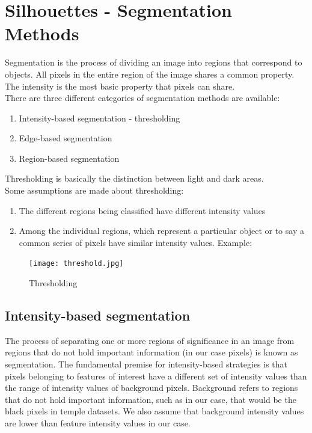 \documentclass[a4paper]{report}
\begin{document}
\section{Silhouettes - Segmentation Methods}
Segmentation is the process of dividing an image into regions that correspond to objects. All pixels in the entire region of the image shares a common property. The intensity is the most basic property that pixels can share. 
\\
There are three different categories of segmentation methods are available:
\begin{enumerate}
\item Intensity-based segmentation - thresholding
\item Edge-based segmentation
\item Region-based segmentation
\end{enumerate}
Thresholding is basically the distinction between light and dark areas.
\\
Some assumptions are made about thresholding:
\begin{enumerate}
\item The different regions being classified have different intensity values
\item Among the individual regions, which represent a particular object or to say a common series of pixels have similar intensity values.
Example:
\end{enumerate}
\begin{figure}[h]
\texttt{[image: threshold.jpg]} 
\caption{Thresholding \cite{UoV:09}}

\end{figure}

\subsection{Intensity-based segmentation}
The process of separating one or more regions of significance in an image from regions that do not hold important information (in our case pixels) is known as segmentation. The fundamental premise for intensity-based strategies is that pixels belonging to features of interest have a different set of intensity values than the range of intensity values of  background pixels.
Background refers to regions that do not hold important information, such as in our case, that would be the black pixels in temple datasets. We also assume that background intensity values are lower than feature intensity values in our case.
\newpage
\end{document}
